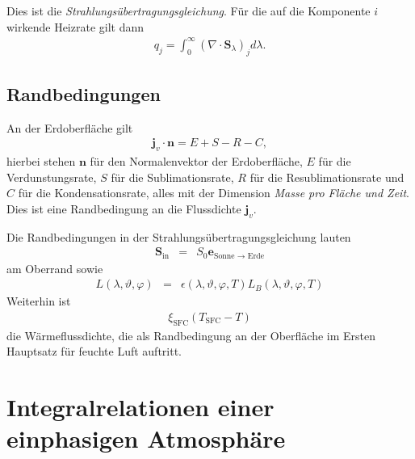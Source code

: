 \documentclass{book}
\begin{document}
%
Dies ist die \textit{Strahlungsübertragungsgleichung}. Für die auf die Komponente $i$ wirkende Heizrate gilt dann
%
\begin{eqnarray}
q_j = \int_{0}^\infty\left(\nabla\cdot\mathbf{S}_\lambda\right)_jd\lambda.
\end{eqnarray}
%
\subsection{Randbedingungen}
\label{sec:randbedingungen_diabatie}

An der Erdoberfläche gilt
%
\begin{eqnarray}
\mathbf{j}_v\cdot\mathbf{n} = E + S - R - C, 
\end{eqnarray}
%
hierbei stehen $\mathbf{n}$ für den Normalenvektor der Erdoberfläche, $E$ für die Verdunstungsrate, $S$ für die Sublimationsrate, $R$ für die Resublimationsrate und $C$ für die Kondensationsrate, alles mit der Dimension \textit{Masse pro Fläche und Zeit}. Dies ist eine Randbedingung an die Flussdichte $\mathbf{j}_v$.

Die Randbedingungen in der Strahlungsübertragungsgleichung lauten
%
\begin{eqnarray}
\mathbf{S}_{\text{in}} & = & S_0\mathbf{e}_{\text{Sonne $\to$ Erde}}
\end{eqnarray}
%
am Oberrand sowie
%
\begin{eqnarray}
L\left(\lambda, \vartheta, \varphi\right) & = & \epsilon\left(\lambda, \vartheta, \varphi, T\right)L_B\left(\lambda, \vartheta, \varphi, T\right)
\end{eqnarray}
%
Weiterhin ist
%
\begin{eqnarray}
\xi_{\text{SFC}}\left(T_{\text{SFC}} - T\right)
\end{eqnarray}
%
die Wärmeflussdichte, die als Randbedingung an der Oberfläche im Ersten Hauptsatz für feuchte Luft auftritt.

\section{Integralrelationen einer einphasigen Atmosphäre}
\label{sec:integralrelationen_einer_einphasigen_atmosphäre}
\end{document}
